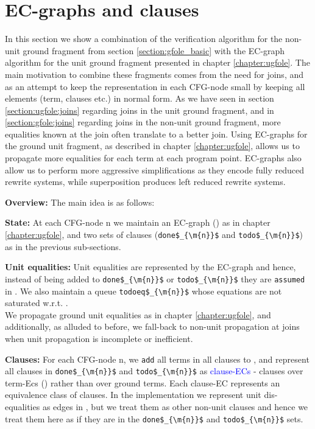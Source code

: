 \newpage
\section{EC-graphs and clauses}\label{section:appendix:gfole_ECGraph}
In this section we show a combination of the verification algorithm for the non-unit ground fragment from section \ref{section:gfole_basic} with the EC-graph algorithm for the unit ground fragment presented in chapter \ref{chapter:ugfole}.
The main motivation to combine these fragments comes from the need for joins, and as an attempt to keep the representation in each CFG-node small by keeping all elements (term, clauses etc.) in normal form.
As we have seen in section \ref{section:ugfole:joins} regarding joins in the unit ground fragment, and in \ref{section:gfole:joins} regarding joins in the non-unit ground fragment, more equalities known at the join often translate to a better join.
Using EC-graphs for the ground unit fragment, as described in chapter \ref{chapter:ugfole}, allows us to propagate more equalities for each term at each program point.
EC-graphs also allow us to perform more aggressive simplifications as they encode fully reduced rewrite systems, while superposition produces left reduced rewrite systems.

\textbf{Overview:}
The main idea is as follows:

\textbf{State:} At each CFG-node n we maintain an EC-graph () as in chapter \ref{chapter:ugfole}, and two sets of clauses (\lstinline|done$_{\m{n}}$| and \lstinline|todo$_{\m{n}}$|) as in the previous sub-sections.

\textbf{Unit equalities:} Unit equalities are represented by the EC-graph and hence, instead of being added to \lstinline|done$_{\m{n}}$| or \lstinline|todo$_{\m{n}}$| they are 
\lstinline|assumed| in . We also maintain a queue \lstinline|todoeq$_{\m{n}}$| whose equations are not saturated w.r.t. \SPG{}.\\
We propagate ground unit equalities as in chapter \ref{chapter:ugfole}, and additionally, as alluded to before, we fall-back to non-unit propagation at joins when unit propagation is incomplete or inefficient.

\textbf{Clauses:} For each CFG-node n, we \lstinline|add| all terms in all clauses to , and represent all clauses in 
\lstinline|done$_{\m{n}}$| and \lstinline|todo$_{\m{n}}$| as \textcolor{blue}{clause-ECs} - clauses over term-Ecs (\GTs{}) rather than over ground terms. Each clause-EC represents an equivalence class of clauses. In the implementation we represent unit dis-equalities as edges in , but we treat them as other non-unit clauses and hence we treat them here as if they are in the \lstinline|done$_{\m{n}}$| and \lstinline|todo$_{\m{n}}$| sets.

